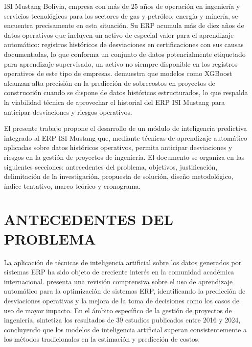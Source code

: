 \documentclass{univalle-perfil}
\begin{document}
ISI Mustang Bolivia, empresa con más de 25 años de operación en ingeniería y servicios tecnológicos para los sectores de gas y petróleo, energía y minería, se encuentra precisamente en esta situación. Su ERP acumula más de diez años de datos operativos que incluyen un activo de especial valor para el aprendizaje automático: registros históricos de desviaciones en certificaciones con sus causas documentadas, lo que conforma un conjunto de datos potencialmente etiquetado para aprendizaje supervisado, un activo no siempre disponible en los registros operativos de este tipo de empresas. \textcite{XGBoostCostOverrun2026} demuestra que modelos como XGBoost alcanzan alta precisión en la predicción de sobrecostos en proyectos de construcción cuando se dispone de datos históricos estructurados, lo que respalda la viabilidad técnica de aprovechar el historial del ERP ISI Mustang para anticipar desviaciones y riesgos operativos.

El presente trabajo propone el desarrollo de un módulo de inteligencia predictiva integrado al ERP ISI Mustang que, mediante técnicas de aprendizaje automático aplicadas sobre datos históricos operativos, permita anticipar desviaciones y riesgos en la gestión de proyectos de ingeniería. El documento se organiza en las siguientes secciones: antecedentes del problema, objetivos, justificación, delimitación de la investigación, propuesta de solución, diseño metodológico, índice tentativo, marco teórico y cronograma.

\section{ANTECEDENTES DEL PROBLEMA}

La aplicación de técnicas de inteligencia artificial sobre los datos generados por sistemas ERP ha sido objeto de creciente interés en la comunidad académica internacional. \textcite{MLdrivenERP2023} presenta una revisión comprensiva sobre el uso de aprendizaje automático para la optimización de sistemas ERP, identificando la predicción de desviaciones operativas y la mejora de la toma de decisiones como los casos de uso de mayor impacto. En el ámbito específico de la gestión de proyectos de ingeniería, \textcite{AIcostEstimation2024} sintetiza los resultados de 39 estudios publicados entre 2016 y 2024, concluyendo que los modelos de inteligencia artificial superan consistentemente a los métodos tradicionales en la estimación y predicción de costos.
\end{document}

